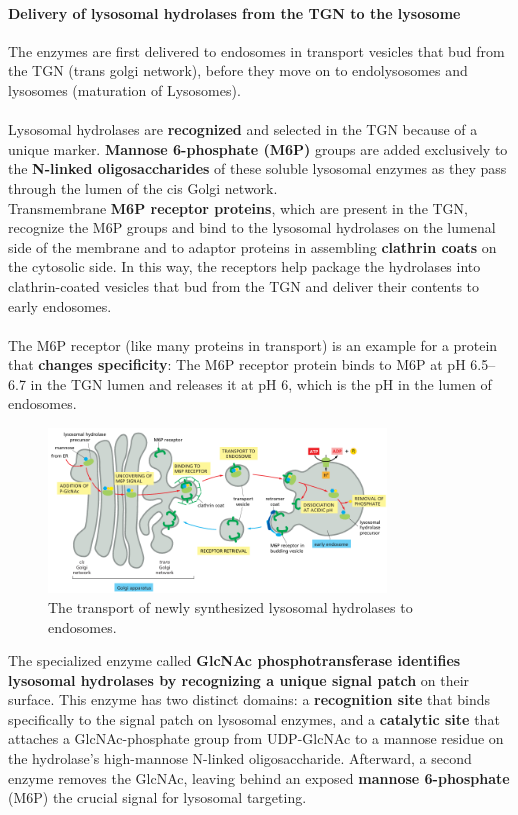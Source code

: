 \documentclass[../main.tex]{subfiles}
\begin{document}
\paragraph{Delivery of lysosomal hydrolases from the TGN to the lysosome}
The enzymes are first delivered to endosomes in transport vesicles that 
bud from the TGN (trans golgi network), before they move on to endolysosomes and lysosomes (maturation of Lysosomes). \\
\\
Lysosomal hydrolases are \textbf{recognized} and selected in the TGN because of a unique marker. \textbf{Mannose 6-phosphate (M6P)} groups are added exclusively to the \textbf{N-linked oligosaccharides} of these soluble lysosomal enzymes as they pass through the lumen of the cis Golgi network. \\
\indent Transmembrane \textbf{M6P receptor proteins}, which are present in the TGN, recognize the M6P groups and bind to the lysosomal hydrolases on the lumenal side of the membrane and to adaptor proteins in assembling \textbf{clathrin coats} on the cytosolic side. In this way, the receptors help package the hydrolases into clathrin-coated vesicles that bud from the TGN and deliver their contents to early endosomes.\\
\\
The M6P receptor (like many proteins in transport) is an example for a protein that \textbf{changes specificity}: The M6P receptor protein binds to M6P at pH 6.5–6.7 in the TGN lumen and releases it at pH 6, which is the pH in the lumen of endosomes. 

\begin{figure}[H]
	\centering
	\includegraphics[width= 0.8\textwidth]{31}
	\caption{The transport of newly synthesized lysosomal hydrolases to endosomes.}
\end{figure}

The specialized enzyme called \textbf{GlcNAc phosphotransferase identifies lysosomal hydrolases by recognizing a unique signal patch} on their surface. This enzyme has two distinct domains: a \textbf{recognition site} that binds specifically to the signal patch on lysosomal enzymes, and a \textbf{catalytic site} that attaches a GlcNAc-phosphate group from UDP-GlcNAc to a mannose residue on the hydrolase’s high-mannose N-linked oligosaccharide. Afterward, a second enzyme removes the GlcNAc, leaving behind an exposed \textbf{mannose 6-phosphate} (M6P) the crucial signal for lysosomal targeting.
\end{document}
